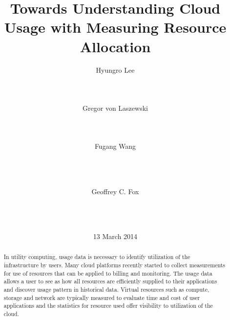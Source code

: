 \documentclass{sig-alternate}
\newcommand{\TITLE}{Towards Understanding Cloud Usage with Measuring Resource Allocation}
\begin{document}
 
% 
 
\title{\TITLE} 
 
\author{ 
\alignauthor 
Hyungro Lee\\ 
       \\ 
       \\ 
       \\ 
\alignauthor 
Gregor von Laszewski\\ 
       \\ 
       \\ 
       \\ 
\alignauthor 
Fugang Wang\\ 
       \\ 
       \\ 
       \\ 
\and
\alignauthor 
Geoffrey C. Fox\\ 
       \\ 
       \\ 
       \\ 
\and  %
} 
\date{13 March 2014} 
 
\toappear{} 
\maketitle 
\begin{abstract} 

In utility computing, usage data is necessary to identify utilization of the infrastructure by users. Many cloud platforms recently started to collect measurements for use of resources that can be applied to billing and monitoring. The usage data allows a user to see as how all resources are efficiently supplied to their applications and discover usage pattern in historical data. Virtual resources such as compute, storage and network are typically measured to evaluate time and cost of user applications and the statistics for resource used offer visibility to utilization of the cloud.

\end{abstract} 
 
\end{document}
